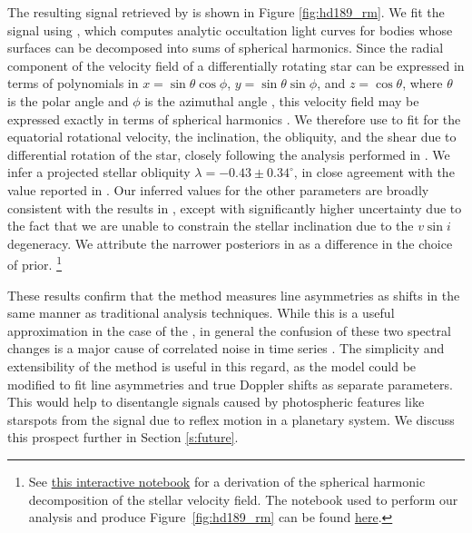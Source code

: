 \documentclass[modern]{aastex62}
\begin{document}
The resulting \RV signal retrieved by \wobble is shown in Figure \ref{fig:hd189_rm}. 
We fit the signal using \starry \citep{Luger2018}, which computes analytic occultation
light curves for bodies whose surfaces can be decomposed into sums
of spherical harmonics. Since the radial component of the velocity field of a 
differentially rotating star can be expressed in terms of polynomials in 
$x = \sin\theta\cos\phi$, $y = \sin\theta\sin\phi$, and $z=\cos\theta$, where
$\theta$ is the polar angle and $\phi$ is the azimuthal angle \citep[c.f. Equation 91 in][]{Short2018},
this velocity field may be expressed exactly in terms of spherical harmonics
\citep{LugerBedell2019}.
We therefore use \starry to fit for the equatorial rotational velocity, the inclination,
the obliquity, and the shear due to differential rotation of the star, closely
following the analysis performed in \citep{Cegla2016}.
We infer a projected stellar obliquity $\lambda = -0.43 \pm 0.34^\circ$, in close agreement
with the value reported in \citet{Cegla2016}. Our inferred values for the other parameters
are broadly consistent with the results in \citet{Cegla2016}, except with significantly
higher uncertainty due to the fact that we are unable to constrain the stellar inclination
due to the $v\sin i$ degeneracy. We attribute the narrower posteriors in \citet{Cegla2016}
as a difference in the choice of prior.
\footnote{See \href{https://github.com/megbedell/wobble/tree/master/scripts/DifferentialRotationWithSphericalHarmonics.ipynb}{this interactive notebook} 
          for a derivation of the spherical harmonic decomposition of the stellar velocity field. 
          The notebook used to perform our analysis and produce Figure~\ref{fig:hd189_rm} can be found 
          \href{https://github.com/megbedell/wobble/tree/master/scripts/HD189733bWithStarry.ipynb}{here}.}

These results confirm that the \wobble method measures line asymmetries as \RV shifts in the same manner as traditional \RV analysis techniques. 
While this is a useful approximation in the case of the \RM, in general the confusion of these two spectral changes is a major cause of correlated noise in \RV time series \citep[e.g.][]{}. 
The simplicity and extensibility of the \wobble method is useful in this regard, as the model could be modified to fit line asymmetries and true Doppler shifts as separate parameters. 
This would help to disentangle signals caused by photospheric features like starspots from the \RV signal due to reflex motion in a planetary system. 
We discuss this prospect further in Section \ref{s:future}.
\end{document}
